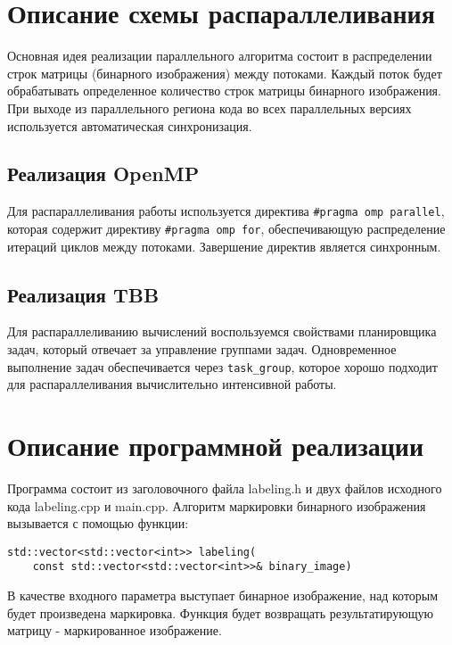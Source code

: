 \documentclass[12pt]{article}
\begin{document}
\section*{Описание схемы распараллеливания}
Основная идея реализации параллельного  алгоритма состоит в распределении строк матрицы (бинарного изображения) между потоками. Каждый поток будет обрабатывать определенное количество строк матрицы бинарного изображения. При выходе из параллельного региона кода во всех параллельных версиях используется автоматическая синхронизация.

\subsection{Реализация OpenMP}
\par Для распараллеливания работы используется директива \verb|#pragma omp parallel|, которая содержит директиву \verb|#pragma omp for|, обеспечивающую распределение итераций циклов между потоками. Завершение директив является синхронным.

\subsection{Реализация TBB}
\par Для распараллеливанию вычислений воспользуемся свойствами планировщика задач, который отвечает за управление группами задач. Одновременное выполнение задач обеспечивается через \verb|task_group|, которое хорошо подходит для распараллеливания вычислительно интенсивной работы.


\section*{Описание программной реализации}
\par Программа состоит из заголовочного файла labeling.h и двух файлов исходного кода labeling.cpp и main.cpp.
Алгоритм маркировки бинарного изображения вызывается с помощью функции:
\begin{lstlisting}
std::vector<std::vector<int>> labeling(
    const std::vector<std::vector<int>>& binary_image) 
\end{lstlisting}
\par В качестве входного параметра выступает бинарное изображение, над которым будет произведена маркировка. Функция будет возвращать результатирующую матрицу - маркированное изображение.
\end{document}
